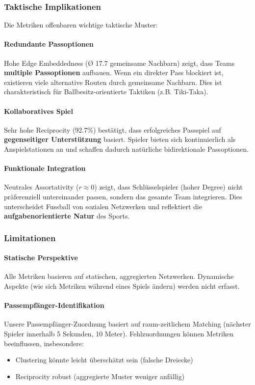 \subsubsection{Taktische Implikationen}

Die Metriken offenbaren wichtige taktische Muster:

\paragraph{Redundante Passoptionen}
Hohe Edge Embeddedness (Ø 17.7 gemeinsame Nachbarn) zeigt, dass Teams \textbf{multiple Passoptionen} aufbauen. Wenn ein direkter Pass blockiert ist, existieren viele alternative Routen durch gemeinsame Nachbarn. Dies ist charakteristisch für Ballbesitz-orientierte Taktiken (z.B. Tiki-Taka).

\paragraph{Kollaboratives Spiel}
Sehr hohe Reciprocity (92.7\%) bestätigt, dass erfolgreiches Passspiel auf \textbf{gegenseitiger Unterstützung} basiert. Spieler bieten sich kontinuierlich als Anspielstationen an und schaffen dadurch natürliche bidirektionale Passoptionen.

\paragraph{Funktionale Integration}
Neutrales Assortativity ($r \approx 0$) zeigt, dass Schlüsselspieler (hoher Degree) nicht präferenziell untereinander passen, sondern das gesamte Team integrieren. Dies unterscheidet Fussball von sozialen Netzwerken und reflektiert die \textbf{aufgabenorientierte Natur} des Sports.

\subsubsection{Limitationen}

\paragraph{Statische Perspektive}
Alle Metriken basieren auf statischen, aggregierten Netzwerken. Dynamische Aspekte (wie sich Metriken während eines Spiels ändern) werden nicht erfasst.

\paragraph{Passempfänger-Identifikation}
Unsere Passempfänger-Zuordnung basiert auf raum-zeitlichem Matching (nächster Spieler innerhalb 5 Sekunden, 10 Meter). Fehlzuordnungen können Metriken beeinflussen, insbesondere:
\begin{itemize}
  \item Clustering könnte leicht überschätzt sein (falsche Dreiecke)
  \item Reciprocity robust (aggregierte Muster weniger anfällig)
\end{itemize}

